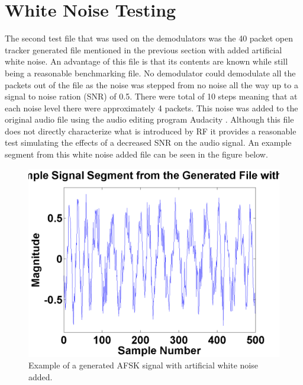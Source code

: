 \section{White Noise Testing}
The second test file that was used on the demodulators was the 40 packet open tracker generated file mentioned in the previous section with added artificial white noise. An advantage of this file is that its contents are known while still being a reasonable benchmarking file. No demodulator could demodulate all the packets out of the file as the noise was stepped from no noise all the way up to a signal to noise ration (SNR) of 0.5. There were  total of 10 steps meaning that at each noise level there were approximately 4 packets. This noise was added to the original audio file using the audio editing program Audacity \cite{Mazzoni}. Although this file does not directly characterize what is introduced by RF it provides a reasonable test simulating the effects of a decreased SNR on the audio signal. An example segment from this white noise added file can be seen in the figure below.
\begin{figure}
  \centering
	\includegraphics[width=0.75\linewidth]{images/ExampleSignalSegmentfromtheGeneratedFilewithNoise.png} 
	\caption{Example of a generated AFSK signal with artificial white noise added.}
\end{figure}
 
